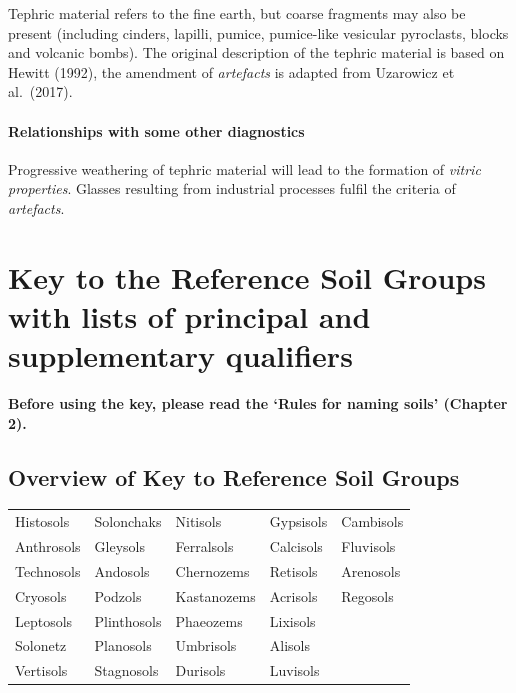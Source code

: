 \documentclass[
  letterpaper,
  DIV=11,
  numbers=noendperiod]{scrreprt}
\begin{document}
Tephric material refers to the fine earth, but coarse fragments may also
be present (including cinders, lapilli, pumice, pumice-like vesicular
pyroclasts, blocks and volcanic bombs). The original description of the
tephric material is based on Hewitt (1992), the amendment of
\emph{artefacts} is adapted from Uzarowicz et al.~(2017).

\hypertarget{relationships-with-some-other-diagnostics-65}{%
\subsubsection{Relationships with some other
diagnostics}\label{relationships-with-some-other-diagnostics-65}}

Progressive weathering of tephric material will lead to the formation of
\emph{vitric properties}. Glasses resulting from industrial processes
fulfil the criteria of \emph{artefacts}.


\hypertarget{key-to-the-reference-soil-groups-with-lists-of-principal-and-supplementary-qualifiers}{%
\chapter{Key to the Reference Soil Groups with lists of principal and
supplementary
qualifiers}\label{key-to-the-reference-soil-groups-with-lists-of-principal-and-supplementary-qualifiers}}

{\textbf{Before using the key, please read the `Rules for naming soils'
(Chapter 2).}}

\hypertarget{overview-of-key-to-reference-soil-groups}{%
\section{Overview of Key to Reference Soil
Groups}\label{overview-of-key-to-reference-soil-groups}}

\begin{longtable}[]{@{}lllll@{}}
\toprule()
\endhead
Histosols & Solonchaks & Nitisols & Gypsisols & Cambisols \\
Anthrosols & Gleysols & Ferralsols & Calcisols & Fluvisols \\
Technosols & Andosols & Chernozems & Retisols & Arenosols \\
Cryosols & Podzols & Kastanozems & Acrisols & Regosols \\
Leptosols & Plinthosols & Phaeozems & Lixisols & \\
Solonetz & Planosols & Umbrisols & Alisols & \\
Vertisols & Stagnosols & Durisols & Luvisols & \\
\bottomrule()
\end{longtable}
\end{document}
